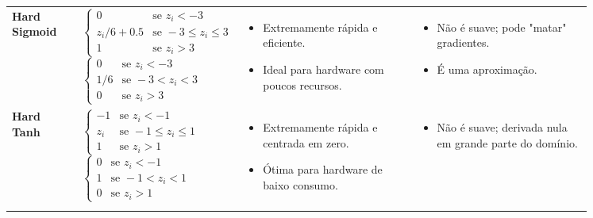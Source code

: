 \begin{longtable}{@{} l p{0.25\linewidth} p{0.3\linewidth} p{0.3\linewidth} @{}}
    \textbf{Hard Sigmoid} &
    $\displaystyle \begin{cases} 0 & \text{se } z_i < -3 \\ z_i/6 + 0.5 & \text{se } -3 \le z_i \le 3 \\ 1 & \text{se } z_i > 3 \end{cases}$ \newline\vspace{0.2cm}
    $\displaystyle \begin{cases} 0 & \text{se } z_i < -3 \\ 1/6 & \text{se } -3 < z_i < 3 \\ 0 & \text{se } z_i > 3 \end{cases}$
    &
    \begin{itemize}[noitemsep, topsep=0pt, partopsep=0pt, leftmargin=*]
        \item Extremamente rápida e eficiente.
        \item Ideal para hardware com poucos recursos.
    \end{itemize}
    &
    \begin{itemize}[noitemsep, topsep=0pt, partopsep=0pt, leftmargin=*]
        \item Não é suave; pode "matar" gradientes.
        \item É uma aproximação.
    \end{itemize}
    \\ \addlinespace
    
    \textbf{Hard Tanh} &
    $\displaystyle \begin{cases} -1 & \text{se } z_i < -1 \\ z_i & \text{se } -1 \le z_i \le 1 \\ 1 & \text{se } z_i > 1 \end{cases}$ \newline\vspace{0.2cm}
    $\displaystyle \begin{cases} 0 & \text{se } z_i < -1 \\ 1 & \text{se } -1 < z_i < 1 \\ 0 & \text{se } z_i > 1 \end{cases}$
    &
    \begin{itemize}[noitemsep, topsep=0pt, partopsep=0pt, leftmargin=*]
        \item Extremamente rápida e centrada em zero.
        \item Ótima para hardware de baixo consumo.
    \end{itemize}
    &
    \begin{itemize}[noitemsep, topsep=0pt, partopsep=0pt, leftmargin=*]
        \item Não é suave; derivada nula em grande parte do domínio.
    \end{itemize}
    \\ \addlinespace


\end{longtable}
